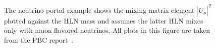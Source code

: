 \documentclass[../report.tex]{subfiles}
\begin{document}
\begin{figure}
{   %
   The neutrino portal example   shows the mixing matrix element $|U_\mu|^2$ plotted against the HLN mass and assumes the latter HLN mixes only with muon flavored neutrinos. All plots in this figure are taken from the PBC report~\cite{Beacham:2019nyx}.%
  }
   \label{fig:sec3_LLP}
\end{figure}

\end{document}
